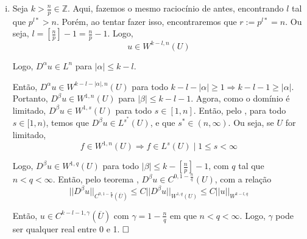 \documentclass[a4paper, 11pt]{article}
\newcommand{\qed}{$\hfill\square$}
\newcommand{\Z}{\mathbb{Z}}
\begin{document}
\begin{enumerate}[(i)]
	Então, aplicando o  em toda $D^\beta u$ com $|\beta|\leq k-l-1$, temos que $D^\beta u \in C^{0, 1 - \frac{n}{r}}(\overline{U})$, já que $r>n$. Outra interpretação é pensar que se a derivada fraca de uma função é contínua, a função é contínua.
	
	
	
	
	Logo, temos que \[ u \in C^{k-l-1, 1 - \frac{n}{r}}(\overline{U}) \]
	
	Agora, para simplificar, vemos que $ 1-\frac{n}{r} = 1 - \frac{n}{p} + l = \left[\frac{n}{p}\right] + 1 - \frac{n}{p}$ e que $ k-l-1 = k - \left[\frac{n}{p}\right] - 1$. Então, \[ u \in C^{k-\left[\frac{n}{p}\right]-1, \gamma}(\overline{U}) \] para $\gamma = \left[\frac{n}{p}\right] + 1 - \frac{n}{p}$, que é 1 menos a parte decimal de $n/p$.
	
	Para a estimativa da norma, sendo $\gamma = 1 - \frac{n}{r}$,
	\begin{align*}
		||u^*||_{C^{0,\gamma}(\overline{U})} &\leq C ||u||_{W^{1,r}(U)}  \leq C ||u||_{W^{k,p}(U)}\\
		\vdots & \leq \vdots \\
		||D^\beta u^*||_{C^{0,\gamma}(\overline{U})} &\leq C ||D^\beta u||_{W^{1,r}(U)} \leq C ||u||_{W^{k,p}(U)}
	\end{align*}

	Pela definição da norma de Hölder (soma das normas de Hölder para as derivadas). Então, ao somar as desigualdades acima, encontramos
	\[ ||u||_{C^{k-\left[\frac{n}{p}\right]-1, \gamma}(\overline{U})} \leq C ||u||_{W^{k,p}(U)} \]\qed
	
	
	
	\item Seja $k>\frac{n}{p} \in \Z$. Aqui, fazemos o mesmo raciocínio de antes, encontrando $l$ tal que $p^{l*}>n$. Porém, ao tentar fazer isso, encontraremos que $r:= p^{l*}=n$. Ou seja, $l = \left[\frac{n}{p}\right]-1 = \frac{n}{p}-1$. Logo, \[ u \in W^{k-l,n}(U) \]

	Logo, $D^\alpha u \in L^n$ para $|\alpha|\leq k-l$.
	
	Então, $ D^\alpha u \in W^{k-l-|\alpha|,n}(U) $ para todo $k-l-|\alpha|\geq1 \Rightarrow k-l-1 \geq |\alpha|$. Portanto, $D^\beta u \in W^{1,n}(U)$ para $|\beta| \leq k-l-1$. Agora, como o domínio é limitado, $D^\beta u \in W^{1,s}(U)$ para todo $s \in [1,n]$. Então, pelo , para todo $s \in [1,n)$, temos que $D^\beta u \in L^{s^*}(U)$, e que $s^* \in (n, \infty)$. Ou seja, se $U$ for limitado, \[f \in W^{1,n}(U) \Rightarrow f \in L^s(U) \mid 1 \leq s < \infty\]
	
	Logo, $D^\beta u \in W^{1,q}(U)$ para todo $|\beta| \leq k - \left[\frac{n}{p}\right] - 1$, com $q$ tal que $n<q<\infty$. Então, pelo teorema , $D^\beta u \in C^{0,1 - \frac{n}{q}}(U)$, com a relação \[ ||D^\beta u||_{C^{0,1 - \frac{n}{q}}(\overline{U})} \leq C ||D^\beta u||_{W^{1,q}(U)} \leq C ||u||_{W^{k-l,q}} \]
	
	Então, $ u \in C^{k-l-1,\gamma}(\overline{U}) $ com $\gamma = 1 - \frac{n}{q}$ em que $n < q < \infty$. Logo, $\gamma$ pode ser qualquer real entre 0 e 1. \qed
	
	
\end{enumerate}
\end{document}
